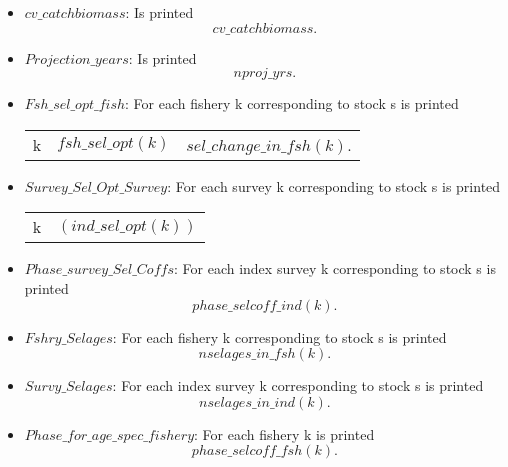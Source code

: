 \documentclass{article}
\begin{document}
\begin{itemize}
\begin{center}
\begin{tabular}{c c c}
    \end{tabular}
\end{center}

\item $cv\_catchbiomass$: Is printed
\begin{equation*}
    cv\_catchbiomass.
\end{equation*}

\item $Projection\_years$: Is printed
\begin{equation*}
    nproj\_yrs.
\end{equation*}

\item $Fsh\_sel\_opt\_fish$: For each fishery k corresponding to stock s is printed
\begin{center}
    \begin{tabular}{c c c}
       k  &  $fsh\_sel\_opt(k)$ & $sel\_change\_in\_fsh(k)$.\\ 
    \end{tabular}
\end{center}

\item $Survey\_Sel\_Opt\_Survey$: For each survey k corresponding to stock s is printed
\begin{center}
    \begin{tabular}{c c}
        k &  $(ind\_sel\_opt(k))$\\
    \end{tabular}
\end{center}

\item $Phase\_survey\_Sel\_Coffs$: For each index survey k corresponding to stock s is printed
\begin{equation*}
    phase\_selcoff\_ind(k).
\end{equation*}

\item $Fshry\_Selages $: For each fishery k corresponding to stock s is printed
\begin{equation*}
    nselages\_in\_fsh(k).
\end{equation*}

\item $Survy\_Selages$: For each index survey k corresponding to stock s is printed
\begin{equation}
    nselages\_in\_ind(k).
\end{equation}

\item $Phase\_for\_age\_spec\_fishery$: For each fishery k is printed
\begin{equation}
    phase\_selcoff\_fsh(k).
\end{equation}


\end{itemize}
\end{document}
